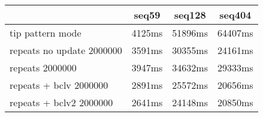 \begin{tabular}{|l|c|c|c|}
\hline
 & seq59 & seq128 & seq404  \\
\hline
tip pattern mode &  4125ms &  51896ms &  64407ms\\
\hline
repeats no update 2000000 &  3591ms &  30355ms &  24161ms\\
\hline
repeats 2000000 &  3947ms &  34632ms &  29333ms\\
\hline
repeats + bclv 2000000 &  2891ms &  25572ms &  20656ms\\
\hline
repeats + bclv2 2000000 &  2641ms &  24148ms &  20850ms\\
\hline
\end{tabular}
